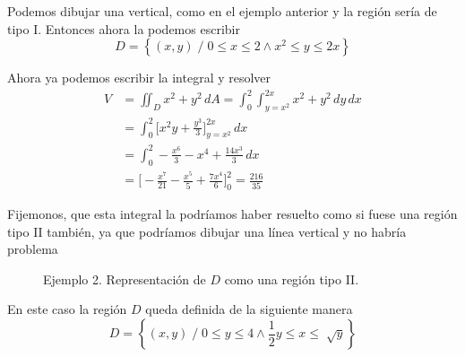 \documentclass[12pt]{article}
\begin{document}
Podemos dibujar una vertical, como en el ejemplo anterior y la región sería de tipo I. Entonces ahora la podemos escribir
\[
  D=\left\{(x,y) \;/\; 0\leq x\leq 2 \land x^2\leq y\leq 2x\right\}
\]

Ahora ya podemos escribir la integral y resolver
\begin{align*}
  V &= \iint_{D} x^2+y^2 \,dA = \int_{0}^{2} \int_{y=x^2}^{2x} x^2+y^2 \,dy\,dx\\
   &= \int_{0}^{2} \Bigg[x^2y+\frac{y^3}{3}\Bigg]_{y=x^2}^{2x} \,dx\\
   &= \int_{0}^{2} -\frac{x^6}{3}-x^4+\frac{14x^3}{3} \,dx\\
    &= \Bigg[-\frac{x^7}{21}-\frac{x^5}{5}+\frac{7x^4}{6}\Bigg]_{0}^{2} = \frac{216}{35}
\end{align*}

Fijemonos, que esta integral la podríamos haber resuelto como si fuese una región tipo II también, ya que podríamos dibujar una línea vertical y no habría problema

\begin{figure}[H]
  \centering
  {\large }
  \caption{Ejemplo 2. Representación de $ D $ como una región tipo II.}
  \label{grf:integral-doble-ej2-2}
\end{figure}

En este caso la región $ D $ queda definida de la siguiente manera
\[
  D=\left\{(x,y) \;/\; 0\leq y\leq 4 \land \frac{1}{2}y\leq x\leq \sqrt[]{y}\right\}
\]
\end{document}
